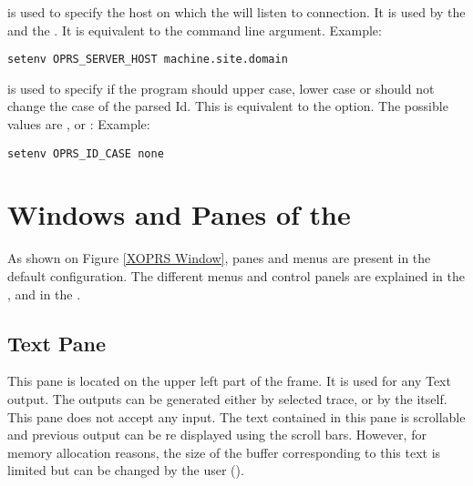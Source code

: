 \begin{description}
\item[\code{OPRS\_SERVER\_HOST}] is used  to specify the host on which the
\OPRSS{} will listen to connection. It is used by the \CPK{} and the
\XPK{}. It is equivalent to the  command line argument.
Example:
\begin{verbatim}
setenv OPRS_SERVER_HOST machine.site.domain
\end{verbatim}

\item[\code{OPRS\_ID\_CASE}] is used to specify if the program should upper case,
lower case or should not change the case of the parsed Id. This is equivalent
to the  option. The possible values
are ,  or :\*
Example:
\begin{verbatim}
setenv OPRS_ID_CASE none
\end{verbatim}

\end{description}

\section{Windows and Panes of the \XPK{}}


As shown on Figure \ref{XOPRS Window}, panes and menus are present in the
default \XOPRS{} configuration. The different menus and control panels are
explained in the , and in the .



\subsection{Text Pane}

This pane is located on the upper left part of the \XOPRS{} frame.  It is used
for any Text output. The outputs can be generated either by selected trace, or
by the \CPK{} itself. This pane does not accept any input. The text contained
in this pane is scrollable and previous output can be re displayed using the
scroll bars. However, for memory allocation reasons, the size of the buffer
corresponding to this text is limited but can be changed by the user
().

